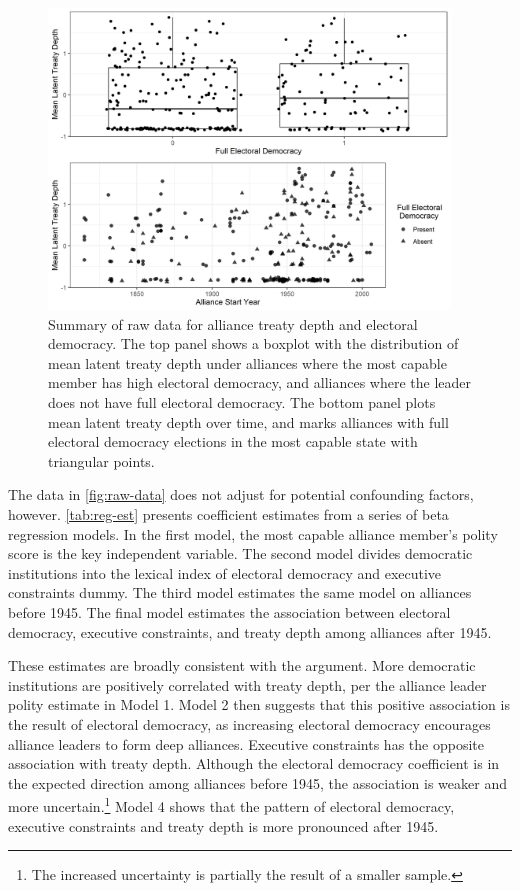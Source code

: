 \documentclass[12pt]{article}
\begin{document}
\begin{figure}[hbtp]
\centering
\includegraphics[width=0.95\textwidth]{../figures/raw-data.png}
\caption{Summary of raw data for alliance treaty depth and electoral democracy. The top panel shows a boxplot with the distribution of mean latent treaty depth under alliances where the most capable member has high electoral democracy, and alliances where the leader does not have full electoral democracy. The bottom panel plots mean latent treaty depth over time, and marks alliances with full electoral democracy elections in the most capable state with triangular points. }
\label{fig:raw-data}
\end{figure}


The data in \autoref{fig:raw-data} does not adjust for potential confounding factors, however. 
\autoref{tab:reg-est} presents coefficient estimates from a series of beta regression models. 
In the first model, the most capable alliance member's polity score is the key independent variable. 
The second model divides democratic institutions into the lexical index of electoral democracy and executive constraints dummy.  
The third model estimates the same model on alliances before 1945. 
The final model estimates the association between electoral democracy, executive constraints, and treaty depth among alliances after 1945. 


These estimates are broadly consistent with the argument. 
More democratic institutions are positively correlated with treaty depth, per the alliance leader polity estimate in Model 1. 
Model 2 then suggests that this positive association is the result of electoral democracy, as increasing electoral democracy encourages alliance leaders to form deep alliances. 
Executive constraints has the opposite association with treaty depth. 
Although the electoral democracy coefficient is in the expected direction among alliances before 1945, the association is weaker and more uncertain.\footnote{The increased uncertainty is partially the result of a smaller sample.} 
Model 4 shows that the pattern of electoral democracy, executive constraints and treaty depth is more pronounced after 1945. 
\end{document}
